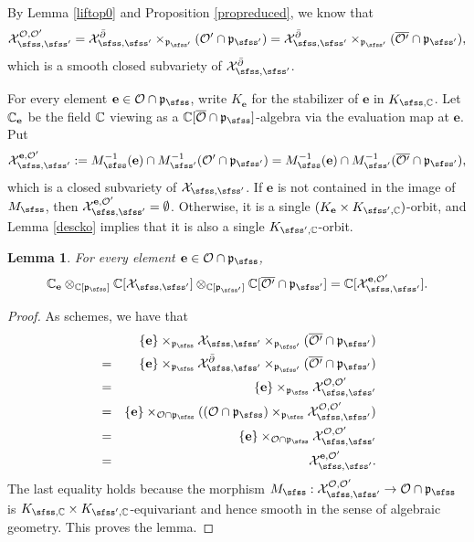 \documentclass[12pt,a4paper]{amsart}
\newcommand{\CO}{{\mathcal {O}}}
\newcommand{\CX}{{\mathcal {X}}}
\newcommand{\p}{\mathfrak p}
\newcommand{\be}{\begin {equation}}
\newcommand{\ee}{\end {equation}}
\numberwithin{equation}{section}
\newtheorem{lem}[thm]{Lemma}
\theoremstyle{remark}
\begin{document}
By Lemma \ref{liftop0} and Proposition \ref{propreduced}, we know that
\be\label{cxee}
 \CX_{\sfss, \sfss'}^{\CO, \CO'}=\CX_{\sfss, \sfss'}^{\bar \partial}\times_{\p_{\sfss'}} ({\CO'}\cap \p_{\sfss'})=\CX_{\sfss, \sfss'}^{\bar \partial}\times_{\p_{\sfss'}} ({\overline{\CO'}}\cap \p_{\sfss'}),
 \ee
 which  is a smooth closed subvariety of $\CX_{\sfss, \sfss'}^{\bar \partial}$.


For every element $\mathbf e\in \CO\cap \p_\sfss$, write $K_\mathbf e$ for the stabilizer of $\mathbf e$ in $K_{\sfss, \C}$. Let $\mathbb{C}_\mathbf e$ be the field $\mathbb{C}$ viewing as a  $\C[\overline \CO\cap \p_\sfss]$-algebra via the evaluation map at $\mathbf e$. Put
\[
  \CX_{\sfss, \sfss'}^{\mathbf e, \CO'}:=M_\sfss^{-1}(\mathbf e)\cap M_{\sfss'}^{-1}(\CO'\cap\p_{\sfss'})=M_\sfss^{-1}(\mathbf e)\cap M_{\sfss'}^{-1}(\overline{\CO'}\cap\p_{\sfss'}),
\]
which is a closed subvariety of $\CX_{\sfss, \sfss'}$. If $\mathbf e$ is not contained in the image of $M_\sfss$, then $\CX_{\sfss, \sfss'}^{\mathbf e, \CO'}=\emptyset$. Otherwise, it is a single
$(K_\mathbf e\times K_{\sfss',\C})$-orbit, and Lemma \ref{descko} implies that it is also a single $K_{\sfss',\C}$-orbit.
\begin{lem}\label{fiber111}
For every element $\mathbf e\in \CO\cap \p_\sfss$,
\[
  \C_\mathbf e \otimes_{\C[\p_{\sfss}]} \C[\CX_{\sfss, \sfss'}]\otimes_{\C[\p_{\sfss'}]} \C[\overline{\CO'}\cap \p_{\sfss'}]=\C[\CX_{\sfss, \sfss'}^{\mathbf e, \CO'}].
\]
\end{lem}
\begin{proof}
As schemes, we have that
\begin{eqnarray*}
  &&\{\mathbf e\}\times_{\p_\sfss}{\CX_{\sfss, \sfss'}}\times_{\p_{\sfss'}} (\overline{\CO'}\cap \p_{\sfss'})\\
  &=& \{\mathbf e\}\times_{\p_\sfss}{\CX^{\bar \partial}_{\sfss, \sfss'}}\times_{\p_{\sfss'}} (\overline{\CO'}\cap \p_{\sfss'})\\
    &=& \{\mathbf e\}\times_{\p_\sfss}   \CX_{\sfss, \sfss'}^{\CO, \CO'}\\
    &=& \{\mathbf e\} \times_{\CO\cap \p_\sfss} ( (\CO\cap \p_\sfss) \times_{\p_\sfss} \CX_{\sfss, \sfss'}^{\CO, \CO'})\\
     &=& \{\mathbf e\} \times_{\CO\cap \p_\sfss} \CX_{\sfss, \sfss'}^{\CO, \CO'}\\
   &=& \CX_{\sfss, \sfss'}^{\mathbf e, \CO'}.
\end{eqnarray*}
The last equality holds because the morphism $M_\sfss: \CX_{\sfss, \sfss'}^{\CO, \CO'}\rightarrow \CO\cap \p_\sfss$  is  $K_{\sfss, \C}\times K_{\sfss',\C}$-equivariant and hence smooth in the sense of algebraic geometry. This proves the lemma.
\end{proof}
\end{document}
